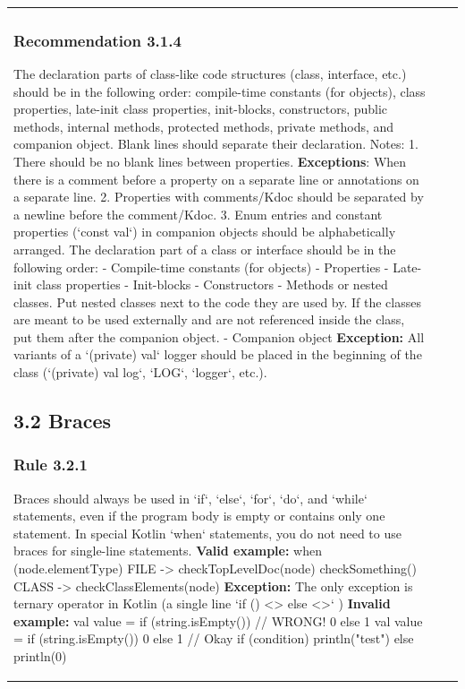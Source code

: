 \begin{center}
\begin{tabular}{ |p{}|p{}|p{}| }
\subsubsection*{\textbf{Recommendation 3.1.4}}
The declaration parts of class-like code structures (class, interface, etc.) should be in the following order: compile-time constants (for objects), class properties, late-init class properties, init-blocks, constructors, public methods, internal methods, protected methods, private methods, and companion object. Blank lines should separate their declaration.
Notes:
1.	There should be no blank lines between properties.
\textbf{Exceptions}: When there is a comment before a property on a separate line or annotations on a separate line.
2.	Properties with comments/Kdoc should be separated by a newline before the comment/Kdoc.
3.	Enum entries and constant properties (`const val`) in companion objects should be alphabetically arranged.
The declaration part of a class or interface should be in the following order:
- Compile-time constants (for objects)
- Properties
- Late-init class properties
- Init-blocks
- Constructors
- Methods or nested classes. Put nested classes next to the code they are used by.
If the classes are meant to be used externally and are not referenced inside the class, put them after the companion object.
- Companion object
\textbf{Exception:}
All variants of a `(private) val` logger should be placed in the beginning of the class (`(private) val log`, `LOG`, `logger`, etc.).
\subsection*{\textbf{3.2 Braces}}
\subsubsection*{\textbf{Rule 3.2.1}}
Braces should always be used in `if`, `else`, `for`, `do`, and `while` statements, even if the program body is empty or contains only one statement. In special Kotlin `when` statements, you do not need to use braces for single-line statements.
\textbf{Valid example:}
when (node.elementType) {
    FILE -> {
        checkTopLevelDoc(node)
        checkSomething()
     }
    CLASS -> checkClassElements(node)
}
\textbf{Exception:} The only exception is ternary operator in Kotlin (a single line `if () <> else <>` )
\textbf{Invalid example:}
val value = if (string.isEmpty())  // WRONG!
                0
            else
                1
val value = if (string.isEmpty()) 0 else 1  // Okay
if (condition) {
    println("test")
} else {
    println(0)
}

\end{tabular}
\end{center}
